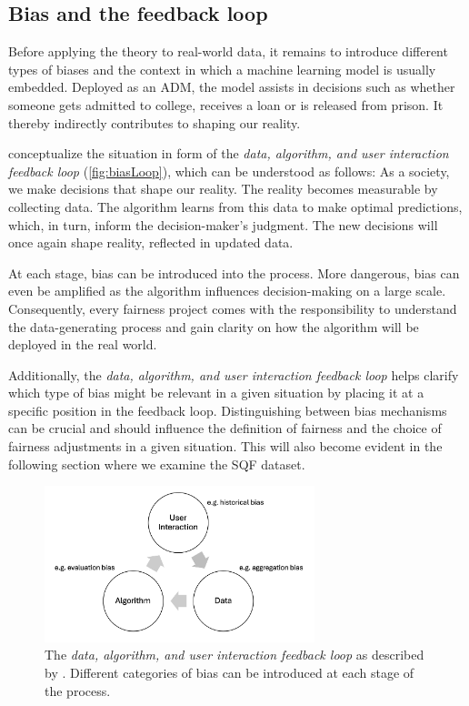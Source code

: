 \subsection{Bias and the feedback loop}
Before applying the theory to real-world data, it remains to introduce different types of biases and the context in which a machine learning model is usually embedded.
Deployed as an ADM, the model assists in decisions such as whether someone gets admitted to college, receives a loan or is released from prison. It thereby indirectly contributes to shaping our reality.\par
\cite{mehrabi2022} conceptualize the situation in form of the \textit{data, algorithm, and user interaction feedback loop} (\autoref{fig:biasLoop}), which can be understood as follows:
As a society, we make decisions that shape our reality. The reality becomes measurable by collecting data. The algorithm learns from this data to make optimal predictions, which, in turn, inform the decision-maker's judgment. The new decisions will once again shape reality, reflected in updated data.\par
At each stage, bias can be introduced into the process. More dangerous, bias can even be amplified as the algorithm influences decision-making on a large scale.
Consequently, every fairness project comes with the responsibility to understand the data-generating process and gain clarity on how the algorithm will be deployed in the real world.\par
Additionally, the \textit{data, algorithm, and user interaction feedback loop} helps clarify which type of bias might be relevant in a given situation by placing it at a specific position in the feedback loop. Distinguishing between bias mechanisms can be crucial and should influence the definition of fairness and the choice of fairness adjustments in a given situation. This will also become evident in the following section where we examine the SQF dataset.

\begin{figure}
    \centering
    \includegraphics[width=0.7\textwidth]{../figures/bias_loop.png}
    \caption{The \textit{data, algorithm, and user interaction feedback loop} as described by \cite{mehrabi2022}. Different categories of bias can be introduced at each stage of the process.}
    \label{fig:biasLoop}
\end{figure}

